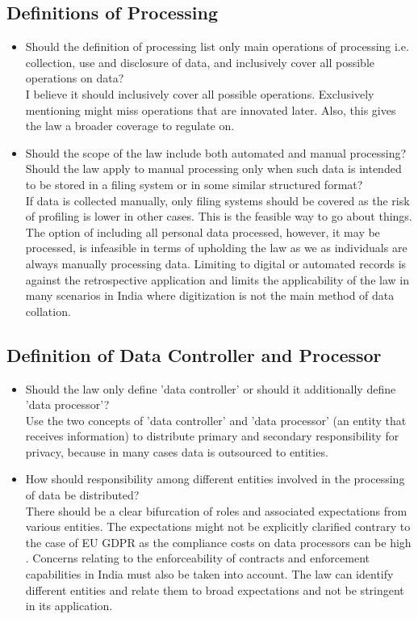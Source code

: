 \subsection{Definitions of Processing}
\begin{itemize}
	\item Should the definition of processing list only main operations of processing i.e. collection, use and disclosure of data, and inclusively cover all possible operations on data?
	\\
	I believe it should inclusively cover all possible operations. Exclusively mentioning might miss operations that are innovated later. Also, this gives the law a broader coverage to regulate on.
	\item Should the scope of the law include both automated and manual processing? Should the law apply to manual processing only when such data is intended to be stored in a filing system or in some similar structured format?
	\\
	If data is collected manually, only filing systems should be covered as the risk of
	profiling is lower in other cases. This is the feasible way to go about things. The option of including all personal data processed, however, it may be processed, is infeasible in terms of upholding the law as we as individuals are always manually processing data. Limiting to digital or automated records is against the retrospective application and limits the applicability of the law in many scenarios in India where digitization is not the main method of data collation.
\end{itemize}
\subsection{Definition of Data Controller and Processor}
\begin{itemize}
	\item Should the law only define 'data controller' or should it additionally define 'data processor'?
	\\
	Use the two concepts of 'data controller' and 'data processor' (an entity that receives information) to distribute primary and secondary responsibility for privacy, because in many cases data is outsourced to entities.
	\item How should responsibility among different entities involved in the processing of data be distributed?
	\\
	There should be a clear bifurcation of roles and associated expectations from various entities. The expectations might not be explicitly clarified contrary to the case of EU GDPR as the compliance costs on data processors can be high \cite{obproc}.  Concerns relating to the enforceability of contracts and enforcement capabilities in India must also be taken into account. The law can identify different entities and relate them to broad expectations and not be stringent in its application.
\end{itemize}
